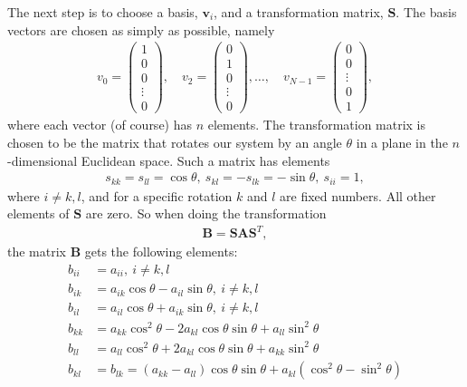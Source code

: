 \documentclass[12pt, a4paper]{article}
\begin{document}
The next step is to choose a basis, $\mathbf{v}_i$, and a transformation matrix, $\mathbf{S}$. The basis 
vectors are chosen as simply as possible, namely 
\begin{align*}
v_0 = \left( \begin{array}{c}
1 \\ 0 \\ 0 \\ \vdots \\ 0
\end{array} \right), \quad 
v_2 = \left( \begin{array}{c}
0 \\ 1 \\ 0 \\ \vdots \\ 0
\end{array} \right), \dots, \quad
v_{N-1} = \left( \begin{array}{c}
0 \\ 0 \\ \vdots \\ 0 \\ 1
\end{array} \right),  
\end{align*}
where each vector (of course) has $n$ elements. The transformation matrix is chosen to be the matrix that 
rotates our system by an angle $\theta$ in a plane in the $n$-dimensional Euclidean space. Such a matrix 
has elements 
\begin{align*}
s_{kk} = s_{ll} = \cos\theta, \: s_{kl} = - s_{lk} = -\sin\theta, \: s_{ii} = 1, 
\end{align*}   
where $i \neq k,l$, and for a specific rotation $k$ and $l$ are fixed numbers. All other elements of 
$\mathbf{S}$ are zero. So when doing the transformation 
\begin{align*}
\mathbf{B} = \mathbf{SAS}^T, 
\end{align*}   
the matrix $\mathbf{B}$ gets the following elements: 
\begin{align*}
b_{ii} & = a_{ii},\: i\neq k,l \\
b_{ik} & = a_{ik}\cos\theta - a_{il}\sin\theta, \: i\neq k,l \\
b_{il} & = a_{il}\cos\theta + a_{ik}\sin\theta, \: i\neq k,l \\
b_{kk} & = a_{kk}\cos^2\theta -2a_{kl}\cos\theta\sin\theta + a_{ll}\sin^2\theta \\
b_{ll} & = a_{ll}\cos^2\theta +2a_{kl}\cos\theta\sin\theta + a_{kk}\sin^2\theta \\
b_{kl} & = b_{lk} = (a_{kk} - a_{ll})\cos\theta\sin\theta + a_{kl}(\cos^2\theta - \sin^2\theta)
\end{align*}  
\end{document}
